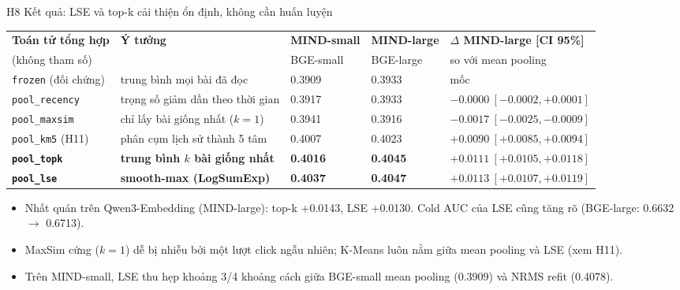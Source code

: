 \documentclass[aspectratio=169,t]{beamer}
\newcommand{\code}[1]{\texttt{#1}}
\begin{document}
\begin{frame}[shrink]{H8 \textperiodcentered{} Kết quả: LSE và top-k cải thiện ổn định, không cần huấn luyện}
\scriptsize
\renewcommand{\arraystretch}{1.05}
\setlength{\tabcolsep}{4pt}
\begin{tabularx}{\textwidth}{@{}P{2.6cm}YQ{1.35cm}Q{1.35cm}P{3.7cm}@{}}
\toprule
\textbf{Toán tử tổng hợp} & \textbf{Ý tưởng} & \textbf{MIND-small} & \textbf{MIND-large} & \textbf{$\Delta$ MIND-large [CI 95\%]}\\
(không tham số) & & BGE-small & BGE-large & so với mean pooling\\
\midrule
\code{frozen} (đối chứng) & trung bình mọi bài đã đọc & 0.3909 & 0.3933 & mốc\\
\code{pool\_recency} & trọng số giảm dần theo thời gian & 0.3917 & 0.3933 & $-0.0000\ [-0.0002, +0.0001]$\\
\code{pool\_maxsim} & chỉ lấy bài giống nhất ($k=1$) & 0.3941 & 0.3916 & $-0.0017\ [-0.0025, -0.0009]$\\
\code{pool\_km5} (H11) & phân cụm lịch sử thành 5 tâm & 0.4007 & 0.4023 & $+0.0090\ [+0.0085, +0.0094]$\\
\textbf{\code{pool\_topk}} & \textbf{trung bình $k$ bài giống nhất} & \textbf{0.4016} & \textbf{0.4045} & $\mathbf{+0.0111}\ [+0.0105, +0.0118]$\\
\textbf{\code{pool\_lse}} & \textbf{smooth-max (LogSumExp)} & \textbf{0.4037} & \textbf{0.4047} & $\mathbf{+0.0113}\ [+0.0107, +0.0119]$\\
\bottomrule
\end{tabularx}
\begin{itemize}
  \setlength{\itemsep}{1pt}
  \item Nhất quán trên Qwen3-Embedding (MIND-large): top-k +0.0143, LSE +0.0130. Cold AUC của LSE cũng tăng rõ (BGE-large: 0.6632 $\to$ 0.6713).
  \item MaxSim cứng ($k=1$) dễ bị nhiễu bởi một lượt click ngẫu nhiên; K-Means luôn nằm giữa mean pooling và LSE (xem H11).
  \item Trên MIND-small, LSE thu hẹp khoảng 3/4 khoảng cách giữa BGE-small mean pooling (0.3909) và NRMS refit (0.4078).
\end{itemize}
\par\kern0pt%
\end{frame}
\end{document}

